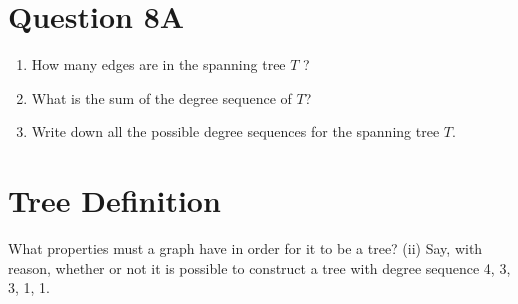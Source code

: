
\section{Question 8A}
\begin{enumerate}
\item How many edges are in the spanning tree $T$ ?
\item What is the sum of the degree sequence of $T$?
\item Write down all the possible degree sequences for the spanning tree $T$.
\end{enumerate}

\section{Tree Definition}
What properties must a graph have in order for it to be a
tree?
(ii) Say, with reason, whether or not it is possible to construct a tree with
degree sequence 4, 3, 3, 1, 1.
\newpage

